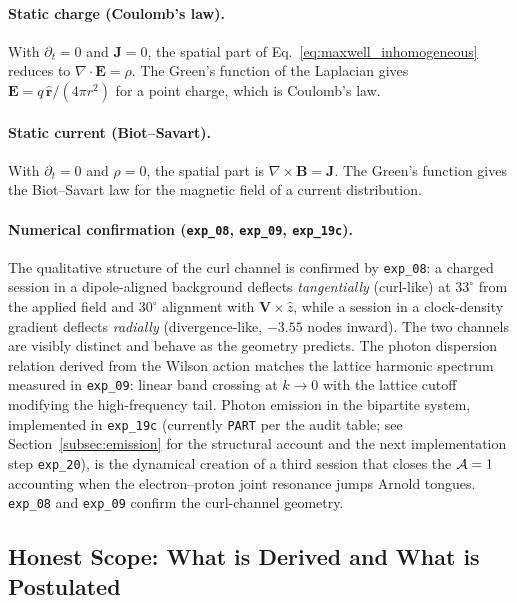 \paragraph{Static charge (Coulomb's law).}
With $\partial_t = 0$ and $\mathbf{J} = 0$, the spatial part of
Eq.~\eqref{eq:maxwell_inhomogeneous} reduces to
$\nabla\cdot\mathbf{E} = \rho$. The Green's function of the Laplacian
gives
$\mathbf{E} = q\,\hat{\mathbf{r}}/(4\pi r^2)$ for a point charge,
which is Coulomb's law.

\paragraph{Static current (Biot--Savart).}
With $\partial_t = 0$ and $\rho = 0$, the spatial part is
$\nabla\times\mathbf{B} = \mathbf{J}$. The Green's function gives the
Biot--Savart law for the magnetic field of a current distribution.

\paragraph{Numerical confirmation (\texttt{exp\_08}, \texttt{exp\_09},
\texttt{exp\_19c}).}
The qualitative structure of the curl channel is confirmed by
\texttt{exp\_08}: a charged session in a dipole-aligned background
deflects \emph{tangentially} (curl-like) at $33^\circ$ from the
applied field and $30^\circ$ alignment with $\mathbf{V}\times\hat{z}$,
while a session in a clock-density gradient deflects \emph{radially}
(divergence-like, $-3.55$ nodes inward).
The two channels are visibly distinct and behave as the geometry
predicts.
The photon dispersion relation derived from the Wilson action matches
the lattice harmonic spectrum measured in \texttt{exp\_09}: linear
band crossing at $k\to 0$ with the lattice cutoff modifying the
high-frequency tail. Photon emission in the bipartite system,
implemented in \texttt{exp\_19c} (currently \texttt{PART} per the
audit table; see Section~\ref{subsec:emission} for the structural
account and the next implementation step \texttt{exp\_20}), is the
dynamical creation of a third session that closes the $\mathcal{A}=1$
accounting when the electron--proton joint resonance jumps Arnold
tongues. \texttt{exp\_08} and \texttt{exp\_09} confirm the
curl-channel geometry.

\subsection{Honest Scope: What is Derived and What is Postulated}
\label{subsec:honest_scope}

